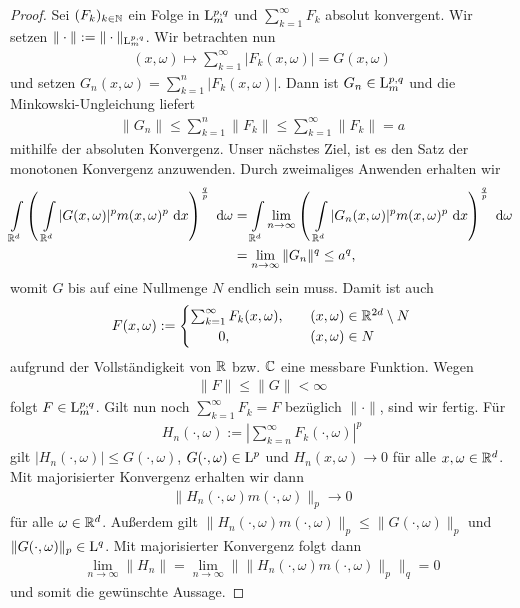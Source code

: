 \begin{proof}
	Sei $ (F_k)_{k \in \mathbb{N}} $ ein Folge in $ \mathrm{L}_m^{p,q} $ und $ \sum_{k=1}^\infty F_k $ absolut konvergent. Wir setzen $ \| \cdot \| := \| \cdot \|_{\mathrm{L}^{p,q}_m} $. 
	Wir betrachten nun 
	\begin{align*}
	(x,\omega) \mapsto \sum \limits_{k=1}^\infty | F_k(x,\omega) | = G(x,\omega)
	\end{align*}
	und setzen $ G_n(x, \omega) = \sum_{k=1}^n | F_k(x,\omega) | $.
	Dann ist $ G_n \in \mathrm{L}^{p,q}_m $ und die Minkowski-Ungleichung liefert
	\begin{align*}
	\| G_n \| \leq \sum \limits_{k=1}^n \| F_k \| 
	\leq \sum \limits_{k=1}^\infty \| F_k \| = a 
	\end{align*}
	mithilfe der absoluten Konvergenz. Unser nächstes Ziel, ist es den Satz der monotonen Konvergenz anzuwenden. Durch zweimaliges Anwenden erhalten wir 
	\begin{align*}
	\int \limits_{\R^d} \left( \ \int \limits_{\R^d}
	|G(x,\omega)|^p m(x,\omega)^p \td{x}
	\right)^{\frac{q}{p}} \td{\omega}
	&=
	\int \limits_{\R^d} 
	\lim \limits_{n \to \infty}
	\left( \ 
	\int \limits_{\R^d}
	|G_n(x,\omega)|^p m(x,\omega)^p \td{x} \right)^{\frac{q}{p}} \td{\omega}\\
	&= \lim \limits_{n \to \infty} \| G_n \|^q \leq a^q,
	\end{align*}
	womit $ G $ bis auf eine Nullmenge $ N $ endlich sein muss. Damit ist auch
	\begin{align*}
	F(x,\omega) :=
	\begin{cases}
	\sum_{k=1}^\infty F_k(x,\omega), &\quad (x,\omega) \in \mathbb{R}^{2d} \setminus N\\
	\quad \quad  0, \quad &\quad (x, \omega) \in N
	\end{cases}
	\end{align*}
	aufgrund der Vollständigkeit von $ \mathbb{R} $ bzw. $ \mathbb{C} $ eine messbare Funktion.
	Wegen 
	\begin{align*}
	\| F \| \leq \| G  \| < \infty
	\end{align*}
	folgt $ F \in \mathrm{L}^{p,q}_m $. Gilt nun noch $ \sum_{k=1}^\infty F_k = F $ bezüglich $ \| \cdot \| $, sind wir fertig.
	Für
	\begin{align*}
	H_n(\cdot, \omega) 
	:= 
	\left| \sum \limits_{k=n}^\infty F_k(\cdot, \omega) \right|^p
	\end{align*}
	gilt $ | H_n(\cdot,\omega) | \leq G(\cdot, \omega)  $, $ G(\cdot, \omega) \in \mathrm{L}^p $ und $ H_n(x, \omega) \to 0 $ für alle $x, \omega \in \mathbb{R}^d $.
	Mit majorisierter Konvergenz erhalten wir dann
	\begin{align*}
	\| H_n(\cdot, \omega) m(\cdot, \omega) \|_p \to 0
	\end{align*}
	für alle $ \omega \in \mathbb{R}^d $. 
	Außerdem gilt $ \| H_n(\cdot, \omega) m(\cdot, \omega)\|_p 
	\leq \| G(\cdot, \omega) \|_p$ und $ \| G(\cdot , \omega ) \|_p\in \mathrm{L}^q $.
	Mit majorisierter Konvergenz folgt dann
	\begin{align*}
	\lim \limits_{n \to \infty}
	\| H_n \|
	=
	\lim \limits_{n \to \infty} 
	\| \| H_n(\cdot , \omega) m(\cdot, \omega) \|_p \|_q
	=0
	\end{align*}
	und somit die gewünschte Aussage.
\end{proof}

